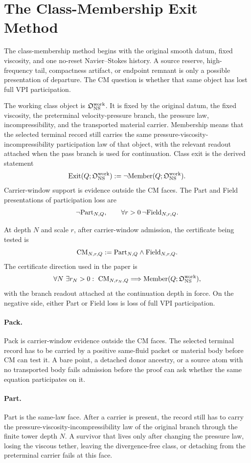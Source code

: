 \section{The Class-Membership Exit Method}
\label{sec:cm-exit-method}

The class-membership method begins with the original smooth datum, fixed
viscosity, and one no-reset Navier--Stokes history.  A source reserve,
high-frequency tail, compactness artifact, or endpoint remnant is only a
possible presentation of departure.  The CM question is whether that same
object has lost full VPI participation.

The working class object is \(\mathfrak O_{\mathrm{NS}}^{\mathrm{work}}\).  It is fixed by the original datum, the fixed viscosity, the preterminal velocity-pressure branch, the pressure law, incompressibility, and the transported material carrier.  Membership means that the selected terminal record still carries the same pressure-viscosity-incompressibility participation law of that object, with the relevant readout attached when the pass branch is used for continuation.  Class exit is the derived statement
\[
  \mathrm{Exit}(Q;\mathfrak O_{\mathrm{NS}}^{\mathrm{work}}):=\neg\mathrm{Member}(Q;\mathfrak O_{\mathrm{NS}}^{\mathrm{work}}).
\]
Carrier-window support is evidence outside the CM faces.  The Part and Field
presentations of participation loss are
\[
  \neg\mathrm{Part}_{N,Q},\qquad
  \forall r>0\,\neg\mathrm{Field}_{N,r,Q}.
\]

At depth \(N\) and scale \(r\), after carrier-window admission, the certificate being tested is
\[
  \mathrm{CM}_{N,r,Q}:=\mathrm{Part}_{N,Q}\wedge\mathrm{Field}_{N,r,Q}.
\]
The certificate direction used in the paper is
\[
  \forall N\ \exists r_N>0:\ \mathrm{CM}_{N,r_N,Q}
  \Longrightarrow
  \mathrm{Member}(Q;\mathfrak O_{\mathrm{NS}}^{\mathrm{work}}),
\]
with the branch readout attached at the continuation depth in force.  On the
negative side, either Part or Field loss is loss of full VPI participation.

\paragraph{Pack.}
Pack is carrier-window evidence outside the CM faces.  The selected terminal record has to be carried by a positive same-fluid packet or material body before CM can test it.  A bare point, a detached donor ancestry, or a source atom with no transported body fails admission before the proof can ask whether the same equation participates on it.

\paragraph{Part.}
Part is the same-law face.  After a carrier is present, the record still has to carry the pressure-viscosity-incompressibility law of the original branch through the finite tower depth \(N\).  A survivor that lives only after changing the pressure law, losing the viscous tether, leaving the divergence-free class, or detaching from the preterminal carrier fails at this face.


